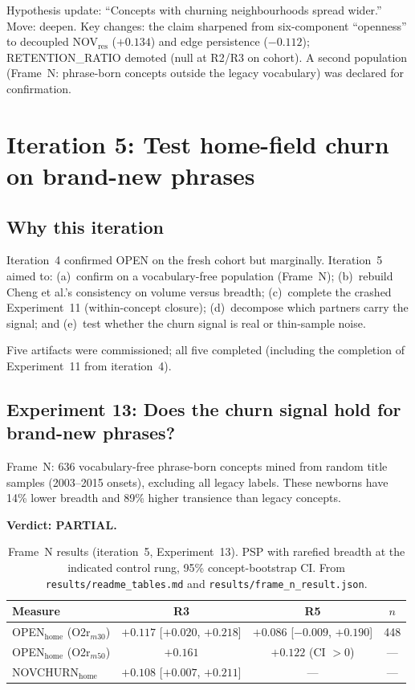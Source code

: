 \documentclass[11pt,letterpaper]{article}
\begin{document}
Hypothesis update: ``Concepts with churning neighbourhoods spread wider.'' Move: deepen. Key changes: the claim sharpened from six-component ``openness'' to decoupled NOV$_{\text{res}}$ ($+0.134$) and edge persistence ($-0.112$); RETENTION\_RATIO demoted (null at R2/R3 on cohort). A second population (Frame~N: phrase-born concepts outside the legacy vocabulary) was declared for confirmation.

\section{Iteration 5: Test home-field churn on brand-new phrases}
\label{sec:iter5}

\subsection{Why this iteration}

Iteration~4 confirmed OPEN on the fresh cohort but marginally. Iteration~5 aimed to: (a)~confirm on a vocabulary-free population (Frame~N); (b)~rebuild Cheng et al.'s consistency on volume versus breadth; (c)~complete the crashed Experiment~11 (within-concept closure); (d)~decompose which partners carry the signal; and (e)~test whether the churn signal is real or thin-sample noise.

Five artifacts were commissioned; all five completed (including the completion of Experiment~11 from iteration~4).

\subsection{Experiment 13: Does the churn signal hold for brand-new phrases?}

Frame~N: 636 vocabulary-free phrase-born concepts mined from random title samples (2003--2015 onsets), excluding all legacy labels. These newborns have 14\% lower breadth and 89\% higher transience than legacy concepts.

\textbf{Verdict: PARTIAL.}

\begin{table}[!htbp]
\centering
\caption{Frame~N results (iteration~5, Experiment~13). PSP with rarefied breadth at the indicated control rung, 95\% concept-bootstrap CI. From \texttt{results/readme\_tables.md} and \texttt{results/frame\_n\_result.json}.}
\label{tab:frame_n}
\small
\begin{tabular}{lccc}
\toprule
Measure & R3 & R5 & $n$ \\
\midrule
OPEN$_{\text{home}}$ (O2r$_{m30}$) & $+0.117$ [$+0.020$, $+0.218$] & $+0.086$ [$-0.009$, $+0.190$] & 448 \\
OPEN$_{\text{home}}$ (O2r$_{m50}$) & $+0.161$ & $+0.122$ (CI $> 0$) & --- \\
NOVCHURN$_{\text{home}}$ & $+0.108$ [$+0.007$, $+0.211$] & --- & --- \\
\bottomrule
\end{tabular}
\end{table}
\end{document}
